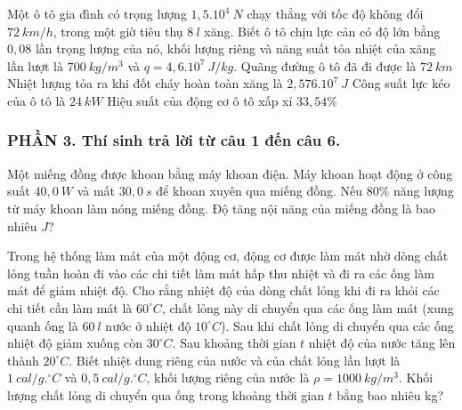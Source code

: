 \begin{ex}
	Một ô tô gia đình có trọng lượng $1,5.10^4\ N$ chạy thẳng với tốc độ không đổi $72\ km/h$, trong một giờ tiêu thụ $8\ l$ xăng. Biết ô tô chịu lực cản có độ lớn bằng $0,08$ lần trọng lượng của nó, khối lượng riêng và năng suất tỏa nhiệt của xăng lần lượt là $700\ kg/m^3$ và $q = 4,6. 10^7\ J/kg$.
	\choiceTFt
	{\True Quãng đường ô tô đã đi được là $72\ km$}
	{Nhiệt lượng tỏa ra khi đốt cháy hoàn toàn xăng là $2,576. 10^7\ J$}
	{\True Công suất lực kéo của ô tô là $24\ kW$}
	{\True Hiệu suất của động cơ ô tô xấp xỉ $33,54\%$}
\end{ex}
\subsubsection*{PHẦN 3. Thí sinh trả lời từ câu 1 đến câu 6.}
\setcounter{ex}{0}
\begin{ex}%
	Một miếng đồng được khoan bằng máy khoan điện. Máy khoan hoạt động ở công suất $40,0\ W$ và mất $30,0\ s$ để khoan xuyên qua miếng đồng. Nếu $80\%$ năng lượng từ máy khoan làm nóng miếng đồng. Độ tăng nội năng của miếng đồng là bao nhiêu $J$?
\end{ex}

\begin{ex}%
	Trong hệ thống làm mát của một động cơ, động cơ được làm mát nhờ dòng chất lỏng tuần hoàn đi vào các chi tiết làm mát hấp thu nhiệt và đi ra các ống làm mát để giảm nhiệt độ. Cho rằng nhiệt độ của dòng chất lỏng khi đi ra khỏi các chi tiết cần làm mát là $60^{\circ}C$, chất lỏng này di chuyển qua các ống làm mát (xung quanh ống là $60\ l$ nước ở nhiệt độ $10^{\circ}C$). Sau khi chất lỏng di chuyển qua các ống nhiệt độ giảm xuống còn $30^{\circ}C$. Sau khoảng thời gian $t$ nhiệt độ của nước tăng lên thành $20^{\circ}C$. Biết nhiệt dung riêng của nước và của chất lỏng lần lượt là $1\ cal/g.^{\circ}C$ và $0,5\ cal/g.^{\circ}C$, khối lượng riêng của nước là $\rho = 1000\ kg/m^3$. Khối lượng chất lỏng di chuyển qua ống trong khoảng thời gian $t$ bằng bao nhiêu kg?
	\par {}
	
\end{ex}

